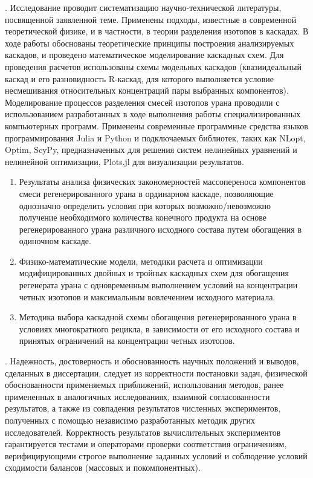 {\methods}.
Исследование проводит систематизацию научно-технической литературы, посвященной заявленной теме.
Применены подходы, известные в современной теоретической физике, и в частности, в теории разделения изотопов в каскадах.
В ходе работы обоснованы теоретические принципы построения анализируемых каскадов, и проведено математическое моделирование каскадных схем.
Для проведения расчетов использованы схемы модельных каскадов (квазиидеальный каскад и его разновидность R-каскад, для которого выполняется условие несмешивания относительных концентраций пары выбранных компонентов). Моделирование процессов разделения смесей изотопов урана проводили с использованием разработанных в ходе выполнения работы специализированных компьютерных программ. Применены современные программные средства языков программирования Julia и Python и подключаемых библиотек, таких как NLopt, Optim, ScyPy, предназначенных для решения систем нелинейных уравнений и нелинейной оптимизации, Plots.jl для визуализации результатов.

{}
\begin{enumerate}
  \item Результаты анализа физических закономерностей массопереноса компонентов смеси регенерированного урана в ординарном каскаде, позволяющие однозначно определить условия при которых возможно/невозможно получение необходимого количества конечного продукта на основе регенерированного урана различного исходного состава путем обогащения в одиночном каскаде.
  \item Физико-математические модели, методики расчета и оптимизации модифицированных двойных и тройных каскадных схем для обогащения регенерата урана с одновременным выполнением условий на концентрации четных изотопов и максимальным вовлечением исходного материала.
  \item Методика выбора каскадной схемы обогащения регенерированного урана в условиях многократного рецикла, в зависимости от его исходного состава и принятых ограничений на концентрации четных изотопов.
\end{enumerate}

{\reliability}.
Надежность, достоверность и обоснованность научных положений и выводов, сделанных в диссертации, следует из корректности постановки задач, физической обоснованности применяемых приближений, использования методов, ранее примененных в аналогичных исследованиях, взаимной согласованности результатов, а также из совпадения результатов численных экспериментов, полученных с помощью независимо разработанных методик других исследователей. Корректность результатов вычислительных экспериментов гарантируется тестами и операторами проверки соответствия ограничениям, верифицирующими строгое выполнение заданных условий и соблюдение условий сходимости балансов (массовых и покомпонентных).

